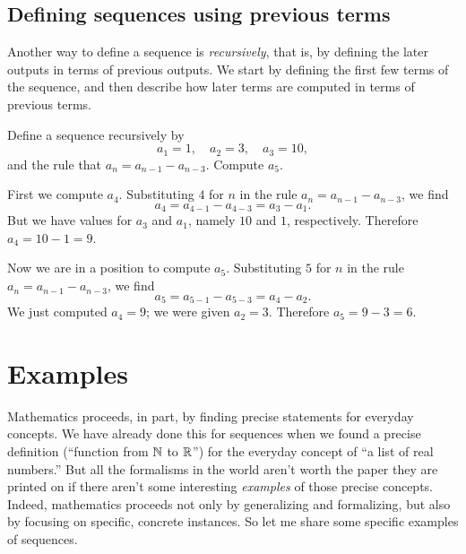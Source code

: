 \subsection{Defining sequences using previous terms}


Another way to define a sequence is \textit{recursively}, that is, by
defining the later outputs in terms of previous outputs.  We start by
defining the first few terms of the sequence, and then describe how
later terms are computed in terms of previous terms.

\begin{example}
Define a sequence recursively by
$$
a_1 = 1, \quad a_2 = 3, \quad a_3 = 10,
$$
and the rule that $a_n = a_{n-1} - a_{n-3}$.  Compute $a_5$.
\end{example}

\begin{solution}
  First we compute $a_4$.  Substituting $4$ for $n$ in the rule $a_n = a_{n-1} - a_{n-3}$, we find
$$
a_4 = a_{4-1} - a_{4-3} = a_3 - a_1.
$$
But we have values for $a_3$ and $a_1$, namely $10$ and $1$, respectively.  Therefore $a_4 = 10 - 1 = 9$.

Now we are in a position to compute $a_5$.  Substituting $5$ for $n$ in the rule $a_n = a_{n-1} - a_{n-3}$, we find
$$
a_5 = a_{5-1} - a_{5-3} = a_4 - a_2.
$$
We just computed $a_4 = 9$; we were given $a_2 = 3$.  Therefore $a_5 = 9 - 3 = 6$.
\end{solution}



\section{Examples}
\label{section:examples}


Mathematics proceeds, in part, by finding precise statements for
everyday concepts.  We have already done this for sequences when we
found a precise definition (``function from $\mathbb{N}$ to $\mathbb{R}$'') for the
everyday concept of ``a list of real numbers.''  But all the
formalisms in the world aren't worth the paper they are printed on if
there aren't some interesting \textit{examples} of those precise
concepts.  Indeed, mathematics proceeds not only by generalizing and
formalizing, but also by focusing on specific, concrete instances.
So let me share some specific examples of sequences.

